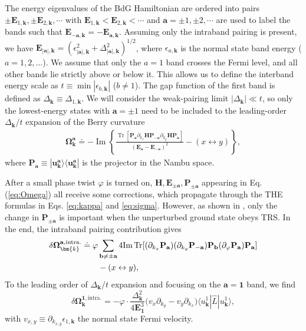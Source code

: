 The energy eigenvalues of the BdG Hamiltonian are ordered into pairs $\pm \mathbf E_{1,\bm{k}},\pm \mathbf E_{2,\bm{k}},\cdots$ with $\mathbf E_{1,\bm k}<\mathbf E_{2,\bm k}<\cdots$ and $\mathbf a=\pm1,\pm2,\cdots$ are used to label the bands such that $\mathbf E_{-\mathbf a,\bm{k}}=-\mathbf E_{\mathbf a,\bm{k}}$. Assuming only the intraband pairing is present, we have $\mathbf E_{|\mathbf a|,\bm{k}}=(\epsilon_{|\mathbf a|,\bm{k}}^2+\varDelta_{|\mathbf a|,\bm{k}}^2)^{1/2}$, where $\epsilon_{a,\bm{k}}$ is the normal state band energy ($a=1,2,...$). We assume that only the $a=1$ band crosses the Fermi level, and all other bands lie strictly above or below it. This allows us to define the interband energy scale as $t\equiv \min |\epsilon_{b,\bm{k}}|$ ($b\neq 1$). The gap function of the first band is defined as $\varDelta_{\bm{k}}\equiv \varDelta_{1,\bm{k}}$. We will consider the weak-pairing limit $|\varDelta_{\bm{k}}|\ll t$, so only the lowest-energy states with $\mathbf a=\pm 1$ need to be included to the leading-order $\varDelta_{\bm k}/t$ expansion of the Berry curvature
\begin{align}
	\boldsymbol \Omega ^{\mathbf a}_{\bm{k}}  \doteq -\mathop{\mathrm{Im}}\left\{\frac{\mathop{\mathrm{Tr}}[\mathbf P_{\mathbf a} \partial_{k_x} \mathbf H \mathbf P_{-\mathbf a} \partial_{k_y}\mathbf H \mathbf P_{\mathbf a}]}{(\mathbf E_{\mathbf a}-\mathbf E_{-\mathbf a})^2}-(x\leftrightarrow y)\right\},\label{eq:Omega}
\end{align}
where $\mathbf P_{\mathbf a}\equiv |\mathbf u^{\mathbf a}_{\bm{k}}\rangle\langle {\mathbf u}^{\mathbf a}_{\bm{k}}|$ is the projector in the Nambu space.

After a small phase twist $\varphi$ is turned on, $\mathbf H, \mathbf E_{\pm\mathbf a}, \mathbf P_{\pm \mathbf a}$ appearing in Eq. (\ref{eq:Omega}) all receive some corrections, which propagate through the THE formulas in Eqs. \eqref{eq:kappa} and \eqref{eq:sigma}. However, as shown in \cite{SM}, only the change in $\mathbf P_{\pm \mathbf a}$ is important when the unperturbed ground state obeys TRS. In the end, the intraband pairing contribution gives 
\begin{align}
	\delta \boldsymbol\Omega^{\mathbf a,\text{intra.}}_{\bm{k}}&\doteq \varphi\sum_{\mathbf b\neq \pm\mathbf a}4 \mbox{Im\,Tr}[ ( \partial_{k_x}\mathbf P_{\mathbf a} ) ( \partial_{k_y}\mathbf P_{-\mathbf a} ) \mathbf P_{\mathbf b} (\partial_\varphi\mathbf P_{\mathbf a} ) \mathbf P_{\mathbf a}]\notag\\
    &\qquad-(x\leftrightarrow y),
\end{align}
To the leading order of $\varDelta_{\bm k}/t$ expansion and focusing on the $\mathbf a = \mathbf 1$ band, we find
\begin{equation}
	\delta \boldsymbol\Omega^{\mathbf 1,\text{intra.}}_{\bm{k}}=-\varphi\cdot\frac{\varDelta_{\bm{k}}^2}{4\mathbf E_{\mathbf 1}^3}\big(v_x \partial_{k_y} - v_y \partial_{k_x}\big)\langle u^1_{\bm{k}}|\hat L|u^1_{\bm{k}}\rangle,\label{eq:Omega_intra}
\end{equation}
with $v_{x,y}\equiv \partial_{k_{x,y}} \epsilon_{1,\bm{k}}$ the normal state Fermi velocity. 

